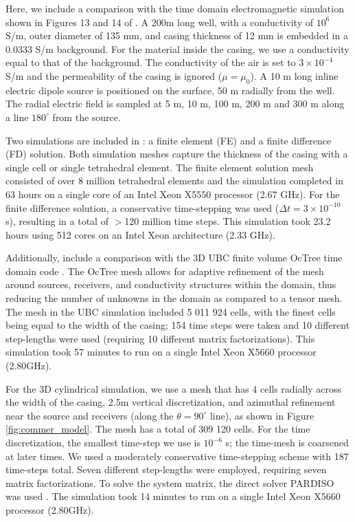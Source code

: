 \documentclass[preprint,review,3p,times,onecolumn,authoryear]{elsarticle}
\begin{document}
Here, we include a comparison with the time domain electromagnetic simulation shown in Figures 13 and 14 of \cite{Commer2015}. A 200m long well, with a conductivity of $10^{6}$ S/m, outer diameter of 135 mm, and casing thickness of 12 mm is embedded in a 0.0333 S/m background. For the material inside the casing, we use a conductivity equal to that of the background. The conductivity of the air is set to $3 \times 10^{-4}$ S/m and the permeability of the casing is ignored ($\mu = \mu_0$). A 10 m long inline electric dipole source is positioned on the surface, 50 m radially from the well. The radial electric field is sampled at 5 m, 10 m, 100 m, 200 m and 300 m along a line $180^{\circ}$ from the source.

Two simulations are included in \cite{Commer2015}: a finite element (FE) and a finite difference (FD) solution. Both simulation meshes capture the thickness of the casing with a single cell or single tetrahedral element. The finite element solution mesh consisted of over 8 million tetrahedral elements and the simulation completed in 63 hours on a single core of an Intel Xeon X5550 processor (2.67 GHz). For the finite difference solution, a conservative time-stepping was used ($\Delta t = 3 \times 10^{-10}$ s), resulting in a total of $>$120 million time steps. This simulation took 23.2 hours using 512 cores on an Intel Xeon architecture (2.33 GHz).

Additionally, include a comparison with the 3D UBC finite volume OcTree time domain code \citep{Haber2007}. The OcTree mesh allows for adaptive refinement of the mesh around sources, receivers, and conductivity structures within the domain, thus reducing the number of unknowns in the domain as compared to a tensor mesh. The mesh in the UBC simulation included 5 011 924 cells, with the finest cells being equal to the width of the casing; 154 time steps were taken and 10 different step-lengths were used (requiring 10 different matrix factorizations). This simulation took 57 minutes to run on a single Intel Xeon X5660 processor (2.80GHz).

For the 3D cylindrical simulation, we use a mesh that has 4 cells radially across the width of the casing, 2.5m vertical discretization, and azimuthal refinement near the source and receivers (along the $\theta=90^\circ$ line), as shown in Figure \ref{fig:commer_model}. The mesh has a total of 309 120 cells. For the time discretization, the smallest time-step we use is $10^{-6}$ s; the time-mesh is coarsened at later times. We used a moderately conservative time-stepping scheme with 187 time-steps total. Seven different step-lengths were employed, requiring seven matrix factorizations. To solve the system matrix, the direct solver PARDISO was used \citep{Petra2014, Cosmin2016}. The simulation took 14 minutes to run on a single Intel Xeon X5660 processor (2.80GHz).
\end{document}
